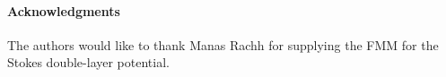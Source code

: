 \documentclass[preprint, 10pt]{elsarticle}
\begin{document}








\paragraph{\bf Acknowledgments} The authors would like to thank Manas
Rachh for supplying the FMM for the Stokes double-layer potential.

 

\end{document}
